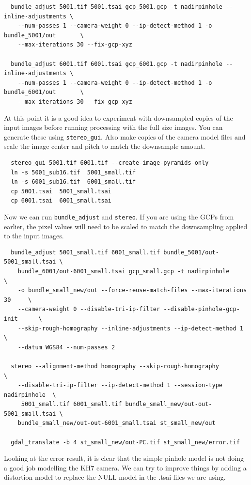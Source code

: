 \begin{verbatim}
  bundle_adjust 5001.tif 5001.tsai gcp_5001.gcp -t nadirpinhole --inline-adjustments \
    --num-passes 1 --camera-weight 0 --ip-detect-method 1 -o bundle_5001/out       \
    --max-iterations 30 --fix-gcp-xyz

  bundle_adjust 6001.tif 6001.tsai gcp_6001.gcp -t nadirpinhole --inline-adjustments \
    --num-passes 1 --camera-weight 0 --ip-detect-method 1 -o bundle_6001/out       \
    --max-iterations 30 --fix-gcp-xyz
\end{verbatim}

At this point it is a good idea to experiment with downsampled copies of the input
images before running processing with the full size images.  You can generate these 
using \texttt{stereo\_gui}.  Also make copies of the camera model
files and scale the image center and pitch to match the downsample amount.

\begin{verbatim}
  stereo_gui 5001.tif 6001.tif --create-image-pyramids-only
  ln -s 5001_sub16.tif  5001_small.tif
  ln -s 6001_sub16.tif  6001_small.tif
  cp 5001.tsai  5001_small.tsai
  cp 6001.tsai  6001_small.tsai
\end{verbatim}

Now we can run \texttt{bundle\_adjust} and \texttt{stereo}.  If you are using the
GCPs from earlier, the pixel values will need to be scaled to match the downsampling
applied to the input images.

\begin{verbatim}
  bundle_adjust 5001_small.tif 6001_small.tif bundle_5001/out-5001_small.tsai \
    bundle_6001/out-6001_small.tsai gcp_small.gcp -t nadirpinhole               \
    -o bundle_small_new/out --force-reuse-match-files --max-iterations 30     \
    --camera-weight 0 --disable-tri-ip-filter --disable-pinhole-gcp-init      \
    --skip-rough-homography --inline-adjustments --ip-detect-method 1         \
    --datum WGS84 --num-passes 2

  stereo --alignment-method homography --skip-rough-homography              \
    --disable-tri-ip-filter --ip-detect-method 1 --session-type nadirpinhole  \
     5001_small.tif 6001_small.tif bundle_small_new/out-out-5001_small.tsai \
    bundle_small_new/out-out-6001_small.tsai st_small_new/out

  gdal_translate -b 4 st_small_new/out-PC.tif st_small_new/error.tif
\end{verbatim}


Looking at the error result, it is clear that the simple pinhole model is not
doing a good job modelling the KH7 camera.  We can try to improve things by
adding a distortion model to replace the NULL model in the .tsai files we are using.

